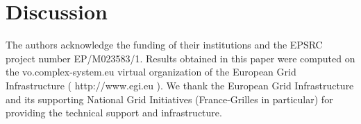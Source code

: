 \documentclass[Afour,sageh,times]{sagej}
\begin{document}
\section{Discussion}





%
%
%
%
%
%


\begin{acks}
The authors acknowledge the funding of their institutions and the EPSRC project number EP/M023583/1. Results obtained in this paper were computed on the vo.complex-system.eu virtual organization of the European Grid Infrastructure ( http://www.egi.eu ). We thank the European Grid Infrastructure and its supporting National Grid Initiatives (France-Grilles in particular) for providing the technical support and infrastructure.
\end{acks}








\end{document}
